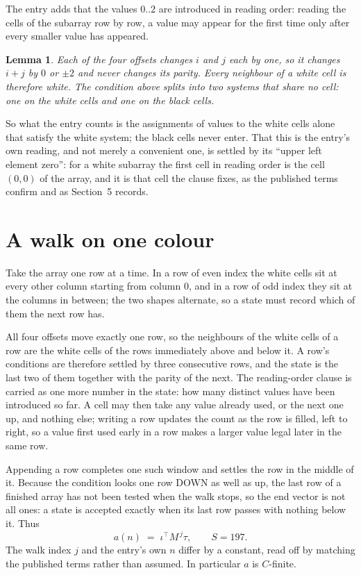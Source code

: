 \documentclass[11pt,a4paper]{article}
\theoremstyle{plain}
\newtheorem{lemma}[theorem]{Lemma}
\theoremstyle{definition}
\begin{document}
The entry adds that the values $0..2$ are introduced in reading order: reading the cells of the subarray row by row, a value may appear for the first time only after every smaller value has appeared.

\begin{lemma}\label{lem:split}
Each of the four offsets changes $i$ and $j$ each by one, so it changes $i+j$ by $0$ or $\pm2$
and never changes its parity. Every neighbour of a white cell is therefore white. The condition
above splits into two systems that share no cell: one on the white cells and one on the black
cells.
\end{lemma}

So what the entry counts is the assignments of values to the white cells alone that satisfy the
white system; the black cells never enter. That this is the entry's own reading, and not
merely a convenient one, is settled by its ``upper left element zero'': for a white subarray the
first cell in reading order is the cell $(0,0)$ of the array, and it is that cell the
clause fixes, as the published terms confirm and as Section~5 records.

\section{A walk on one colour}

Take the array one row at a time. In a row of even index the white cells sit at every other
column starting from column $0$, and in a row of odd index they sit at the columns in
between; the two shapes alternate, so a state must record which of them the next row has.

All four offsets move exactly one row, so the neighbours of the white cells of a row are the
white cells of the rows immediately above and below it. A row's conditions are therefore settled
by three consecutive rows, and the state is the last two of them together with the parity of the
next.
The reading-order clause is carried as one more number in the state: how many distinct values
have been introduced so far. A cell may then take any value already used, or the next one up,
and nothing else; writing a row updates the count as the row is filled, left to right, so a
value first used early in a row makes a larger value legal later in the same row.


Appending a row completes one such window and settles the row in the middle of it. Because the
condition looks one row DOWN as well as up, the last row of a finished array has not been tested
when the walk stops, so the end vector is not all ones: a state is accepted exactly when its
last row passes with nothing below it. Thus
\[
a(n)\;=\;\iota^{\!\top}M^{\,j}\tau ,\qquad S=197.
\]
The walk index $j$ and the entry's own $n$ differ by a constant, read off by matching the
published terms rather than assumed. In particular $a$ is $C$-finite.
\end{document}
